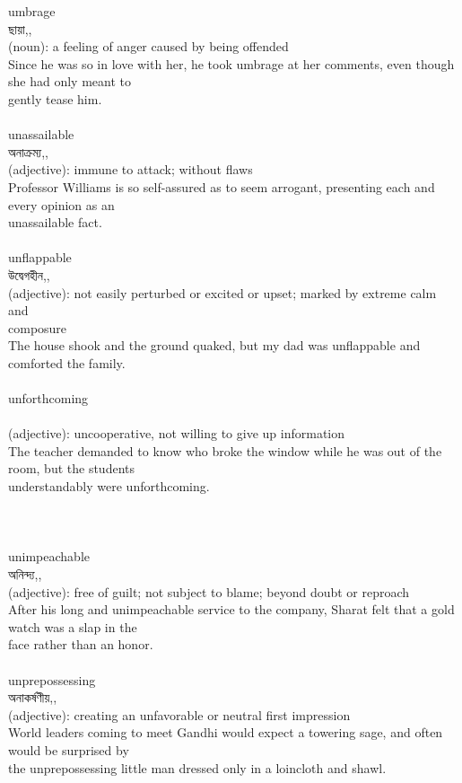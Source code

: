 \documentclass{article}
\begin{document}
{{umbrage}\\
{ছায়া,,}\\
{(noun): a feeling of anger caused by being offended\\Since he was so in love with her, he took umbrage at her comments, even though she had only meant to\\gently tease him.\\}\\
{unassailable}\\
{অনাক্রম্য,,}\\
{(adjective): immune to attack; without flaws\\Professor Williams is so self-assured as to seem arrogant, presenting each and every opinion as an\\unassailable fact.\\}\\
{unflappable}\\
{উদ্বেগহীন,,}\\
{(adjective): not easily perturbed or excited or upset; marked by extreme calm and\\composure\\The house shook and the ground quaked, but my dad was unflappable and comforted the family.\\}\\
{unforthcoming}\\
{}\\
{(adjective): uncooperative, not willing to give up information\\The teacher demanded to know who broke the window while he was out of the room, but the students\\understandably were unforthcoming.\\\\                                                                               \\}\\
{unimpeachable}\\
{অনিন্দ্য,,}\\
{(adjective): free of guilt; not subject to blame; beyond doubt or reproach\\After his long and unimpeachable service to the company, Sharat felt that a gold watch was a slap in the\\face rather than an honor.\\}\\
{unprepossessing}\\
{অনাকর্ষণীয়,,}\\
{(adjective): creating an unfavorable or neutral first impression\\World leaders coming to meet Gandhi would expect a towering sage, and often would be surprised by\\the unprepossessing little man dressed only in a loincloth and shawl.\\}\\
}
\end{document}

